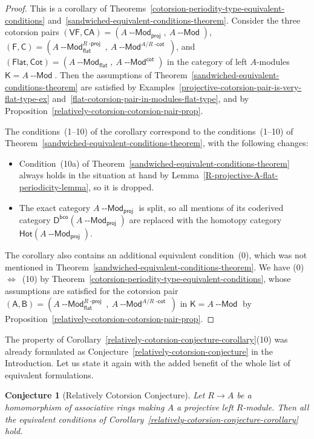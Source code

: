\documentclass[12pt,a4paper]{amsart}
\newcommand{\+}{\nobreakdash-}
\renewcommand{\:}{\colon}
\newcommand{\rarrow}{\longrightarrow}
\newcommand{\Modl}{{\operatorname{\mathsf{--Mod}}}}
\newcommand{\sA}{\mathsf A}
\newcommand{\sB}{\mathsf B}
\newcommand{\sC}{\mathsf C}
\newcommand{\sD}{\mathsf D}
\newcommand{\sF}{\mathsf F}
\newcommand{\sK}{\mathsf K}
\newcommand{\VF}{\mathsf{VF}}
\newcommand{\CA}{\mathsf{CA}}
\newcommand{\Flat}{\mathsf{Flat}}
\newcommand{\Cot}{\mathsf{Cot}}
\newcommand{\Hot}{\mathsf{Hot}}
\newcommand{\proj}{\mathsf{proj}}
\renewcommand{\flat}{\mathsf{flat}}
\renewcommand{\cot}{\mathsf{cot}}
\newcommand{\bco}{\mathsf{bco}}
\newcommand{\dcot}{{\operatorname{\mathsf{-cot}}}}
\newcommand{\dproj}{{\operatorname{\mathsf{-proj}}}}
\theoremstyle{plain}
\newtheorem{conj}[thm]{Conjecture}
\theoremstyle{definition}
\begin{document}
\begin{proof}
 This is a corollary of
Theorems~\ref{cotorsion-periodity-type-equivalent-conditions}
and~\ref{sandwiched-equivalent-conditions-theorem}.
 Consider the three cotorsion pairs $(\VF,\CA)=(A\Modl_\proj,\>A\Modl)$,
\ $(\sF,\sC)=(A\Modl_\flat^{R\dproj},\>A\Modl^{A/R\dcot})$, and
$(\Flat,\Cot)=(A\Modl_\flat,\>A\Modl^\cot)$ in the category of left
$A$\+modules $\sK=A\Modl$.
 Then the assumptions of
Theorem~\ref{sandwiched-equivalent-conditions-theorem} are satisfied
by Examples~\ref{projective-cotorsion-pair-is-very-flat-type-ex}
and~\ref{flat-cotorsion-pair-in-modules-flat-type}, and
by Proposition~\ref{relatively-cotorsion-cotorsion-pair-prop}.

 The conditions~(1\+-10) of the corollary correspond to
the conditions~(1\+-10) of
Theorem~\ref{sandwiched-equivalent-conditions-theorem},
with the following changes:
\begin{itemize}
\item Condition~(10a) of
Theorem~\ref{sandwiched-equivalent-conditions-theorem} always holds
in the situation at hand by
Lemma~\ref{R-projective-A-flat-periodicity-lemma}, so it is dropped.
\item The exact category $A\Modl_\proj$ is split, so all mentions of
its coderived category $\sD^\bco(A\Modl_\proj)$ are replaced with
the homotopy category $\Hot(A\Modl_\proj)$.
\end{itemize}

 The corollary also contains an additional equivalent condition~(0),
which was not mentioned in
Theorem~\ref{sandwiched-equivalent-conditions-theorem}.
 We have (0)~$\Longleftrightarrow$~(10) by
Theorem~\ref{cotorsion-periodity-type-equivalent-conditions},
whose assumptions are satisfied for the cotorsion pair
$(\sA,\sB)=(A\Modl_\flat^{R\dproj},\>A\Modl^{A/R\dcot})$ in $\sK=A\Modl$
by Proposition~\ref{relatively-cotorsion-cotorsion-pair-prop}.
\end{proof}

 The property of
Corollary~\ref{relatively-cotorsion-conjecture-corollary}(10)
was already formulated as
Conjecture~\ref{relatively-cotorsion-conjecture} in the Introduction.
 Let us state it again with the added benefit of the whole list of
equivalent formulations.

\begin{conj}[Relatively Cotorsion Conjecture]
 Let $R\rarrow A$ be a homomorphism of associative rings making $A$
a projective left $R$\+module.
 Then all the equivalent conditions of
Corollary~\ref{relatively-cotorsion-conjecture-corollary} hold.
\end{conj}
\end{document}
